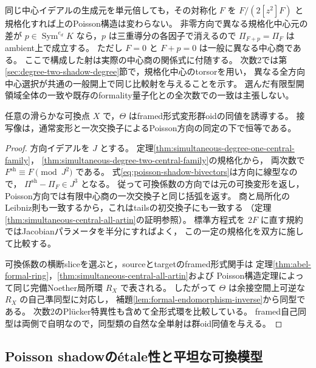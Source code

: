 \begin{remark}[規格化と中心選択]
同じ中心イデアルの生成元を単元倍しても，その対称化 $F$ を
$F/(2[z^2]F)$ と規格化すれば上のPoisson構造は変わらない。
非零方向で異なる規格化中心元の差が
$p\in\operatorname{Sym}^{e_d}K$ なら，$p$ は三重導分の各因子で消えるので
$\Pi_{F+p}=\Pi_F$ はambient上で成立する。
ただし $F=0$ と $F+p=0$ は一般に異なる中心商である。
ここで構成した射は実際の中心商の関係式に付随する。
次数2では第\ref{sec:degree-two-shadow-degree}節で，規格化中心のtorsorを用い，
異なる全方向中心選択が共通の一般開上で同じ比較射を与えることを示す。
選んだ有限型開領域全体の一致や既存のformality量子化との全次数での一致は主張しない。
\end{remark}

\begin{proposition}[可換点での全形式比較]
\label{prop:poisson-shadow-formal-comparison}
任意の滑らかな可換点 $X$ で，$\Theta$ はframed形式変形群oidの同値を誘導する。
接写像は，通常変形と一次交換子によるPoisson方向の同定の下で恒等である。
\end{proposition}
\begin{proof}
方向イデアルを $J$ とする。
定理\ref{thm:simultaneous-degree-one-central-family}，
\ref{thm:simultaneous-degree-two-central-family}の規格化から，
両次数で $F^{\mathrm{sh}}\equiv F\pmod{J^2}$ である。
式\eqref{eq:poisson-shadow-bivectors}は方向に線型なので，
$\Pi^{\mathrm{sh}}-\Pi_F\in J^3$ となる。
従って可換係数の方向では元の可換変形を返し，
Poisson方向では有限中心商の一次交換子と同じ括弧を返す。
商と局所化のLeibniz則も一致するから，これはtailsの初交換子にも一致する
（定理\ref{thm:simultaneous-central-all-artin}の証明参照）。
標準方程式を $2F$ に直す規約ではJacobianパラメータを半分にすればよく，
この一定の規格化を双方に施して比較する。

可換係数の横断sliceを選ぶと，sourceとtargetのframed形式関手は
定理\ref{thm:abel-formal-ring}，\ref{thm:simultaneous-central-all-artin}および
Poisson構造定理によって同じ完備Noether局所環 $R_X$ で表される。
したがって $\Theta$ は余接空間上可逆な $R_X$ の自己準同型に対応し，
補題\ref{lem:formal-endomorphism-inverse}から同型である。
次数2のPl\"ucker特異性も含めて全形式環を比較している。
framed自己同型は両側で自明なので，同型類の自然な全単射は群oid同値を与える。
\end{proof}

\subsection{Poisson shadowの\'{e}tale性と平坦な可換模型}

